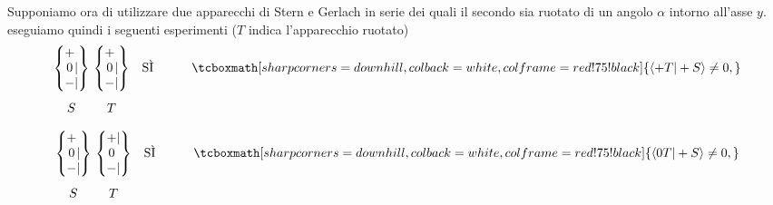 \documentclass[a4paper,12pt,oneside]{book}
\begin{document}
Supponiamo ora di utilizzare due apparecchi di Stern e Gerlach in serie dei quali il secondo sia ruotato di un angolo $\alpha$ intorno all'asse $y$. eseguiamo quindi i seguenti esperimenti ($T$ indica l'apparecchio ruotato)
	\begin{equation}
		\begin{matrix}
		\begin{Bmatrix}
 			\makebox[\widthof{$-$}]{$+$}\makebox[\widthof{$|$}]{$\ $} \\ \makebox[\widthof{$-$}]{$0$}|\\ - | 
		\end{Bmatrix} \\[0.7cm]
			S
		\end{matrix} \
		\begin{matrix}
		\begin{Bmatrix}
			\makebox[\widthof{$-$}]{$+$}\makebox[\widthof{$|$}]{$\ $} \\ \makebox[\widthof{$-$}]{$0$}|\\ - | 
		\end{Bmatrix} & \textrm{SÌ} & \qquad\tcboxmath[sharp corners=downhill ,colback=white,colframe=red!75!black]{\langle +T | +S \rangle \neq 0,} \\[0.7cm]
			T & &
		\end{matrix}
	\label{SG5}
	\end{equation}

	\begin{equation}
		\begin{matrix}
		\begin{Bmatrix}
			\makebox[\widthof{$-$}]{$+$}\makebox[\widthof{$|$}]{$\ $} \\ \makebox[\widthof{$-$}]{$0$}|\\ - | 
		\end{Bmatrix} \\[0.7cm]
			S
		\end{matrix} \
		\begin{matrix}
		\begin{Bmatrix}
			\makebox[\widthof{$-$}]{$+$} | \\ \makebox[\widthof{$-$}]{$0$}\makebox[\widthof{$|$}]{$\ $} \\ - | 
		\end{Bmatrix} & \textrm{SÌ} & \qquad\tcboxmath[sharp corners=downhill ,colback=white,colframe=red!75!black]{\langle 0T | +S \rangle \neq 0,} \\[0.7cm]
			T & &
		\end{matrix}
	\label{SG6}
	\end{equation}
\end{document}
